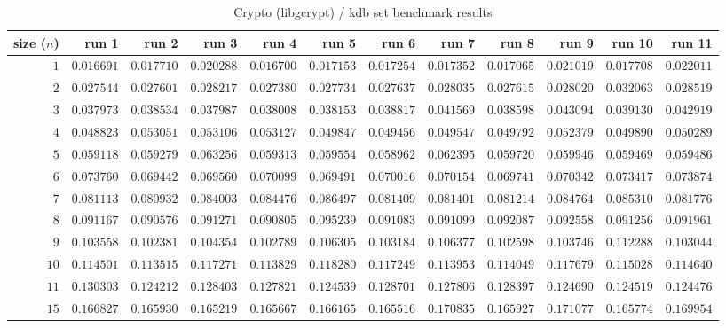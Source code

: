  
\begin{sidewaystable} \centering \caption{Crypto (libgcrypt) / kdb set benchmark results} \label{eval-table-libgcrypt-set} \scriptsize \begin{tabular}{r|rrrrrrrrrrr} size ($n$) & run 1 & run 2 & run 3 & run 4 & run 5 & run 6 & run 7 & run 8 & run 9 & run 10 & run 11\\ \hline
$1$ & $0.016691$ & $0.017710$ & $0.020288$ & $0.016700$ & $0.017153$ & $0.017254$ & $0.017352$ & $0.017065$ & $0.021019$ & $0.017708$ & $0.022011$ \\
$2$ & $0.027544$ & $0.027601$ & $0.028217$ & $0.027380$ & $0.027734$ & $0.027637$ & $0.028035$ & $0.027615$ & $0.028020$ & $0.032063$ & $0.028519$ \\
$3$ & $0.037973$ & $0.038534$ & $0.037987$ & $0.038008$ & $0.038153$ & $0.038817$ & $0.041569$ & $0.038598$ & $0.043094$ & $0.039130$ & $0.042919$ \\
$4$ & $0.048823$ & $0.053051$ & $0.053106$ & $0.053127$ & $0.049847$ & $0.049456$ & $0.049547$ & $0.049792$ & $0.052379$ & $0.049890$ & $0.050289$ \\
$5$ & $0.059118$ & $0.059279$ & $0.063256$ & $0.059313$ & $0.059554$ & $0.058962$ & $0.062395$ & $0.059720$ & $0.059946$ & $0.059469$ & $0.059486$ \\
$6$ & $0.073760$ & $0.069442$ & $0.069560$ & $0.070099$ & $0.069491$ & $0.070016$ & $0.070154$ & $0.069741$ & $0.070342$ & $0.073417$ & $0.073874$ \\
$7$ & $0.081113$ & $0.080932$ & $0.084003$ & $0.084476$ & $0.086497$ & $0.081409$ & $0.081401$ & $0.081214$ & $0.084764$ & $0.085310$ & $0.081776$ \\
$8$ & $0.091167$ & $0.090576$ & $0.091271$ & $0.090805$ & $0.095239$ & $0.091083$ & $0.091099$ & $0.092087$ & $0.092558$ & $0.091256$ & $0.091961$ \\
$9$ & $0.103558$ & $0.102381$ & $0.104354$ & $0.102789$ & $0.106305$ & $0.103184$ & $0.106377$ & $0.102598$ & $0.103746$ & $0.112288$ & $0.103044$ \\
$10$ & $0.114501$ & $0.113515$ & $0.117271$ & $0.113829$ & $0.118280$ & $0.117249$ & $0.113953$ & $0.114049$ & $0.117679$ & $0.115028$ & $0.114640$ \\
$11$ & $0.130303$ & $0.124212$ & $0.128403$ & $0.127821$ & $0.124539$ & $0.128701$ & $0.127806$ & $0.128397$ & $0.124690$ & $0.124519$ & $0.124476$ \\
$15$ & $0.166827$ & $0.165930$ & $0.165219$ & $0.165667$ & $0.166165$ & $0.165516$ & $0.170835$ & $0.165927$ & $0.171077$ & $0.165774$ & $0.169954$ \\

\end{tabular}
\end{sidewaystable}

